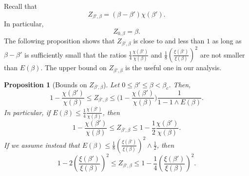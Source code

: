 \documentclass[11pt,a4paper]{article}
\numberwithin{equation}{section}
\theoremstyle{plain}
\newtheorem{Prop}[Thm]{Proposition}
\theoremstyle{definition}
\newcommand\1{\mathds{1}}
\begin{document}
Recall that
\begin{equation}
\label{eq:Zdef1}
Z_{\beta',\beta}=
(\beta-\beta')\chi(\beta').
\end{equation}
In particular,
\begin{equation}
\label{eq:Z0}
        Z_{0,\beta} = \beta .
\end{equation}
The following proposition shows that $Z_{\beta',\beta}$ is close to and less than $1$
as long as $\beta-\beta'$ is sufficiently small that the
ratios $\frac 14 \frac{\chi(\beta')}{\chi(\beta)}$ and
$\frac 18 (\frac{\xi(\beta')}{\xi(\beta)})^2$ are not smaller than $E(\beta)$. The upper bound on $Z_{\beta',\beta}$ is the useful one in our analysis.


\begin{Prop}[Bounds on $Z_{\beta',\beta}$]
\label{prop:Zbd}
Let $0\leq \beta'\leq \beta<\beta_c$. Then,
\begin{equation}
\label{eq: bounds on Z1}
	1-\frac{\chi(\beta')}{\chi(\beta)}\leq Z_{\beta',\beta}\leq \Big(1-\frac{\chi(\beta')}{\chi(\beta)}\Big)\frac{1}{1-1\wedge E(\beta)}.
\end{equation}
In particular, if $E(\beta)\leq \tfrac{1}{4}\tfrac{\chi(\beta')}{\chi(\beta)}$, then
\begin{equation}\label{eq: explicit bounds on Z1}
	1-\frac{\chi(\beta')}{\chi(\beta)}\leq Z_{\beta',\beta}\leq 1-\frac{1}{2}\frac{\chi(\beta')}{\chi(\beta)}.
\end{equation}
If we assume instead
that $E(\beta)\leq \tfrac{1}{8}(\tfrac{\xi(\beta')}{\xi(\beta)})^2 \wedge \tfrac{1}{2}$, then
\begin{equation}
\label{eq: bounds on Z in terms of n/N}
	1-2\left(\frac{\xi(\beta')}{\xi(\beta)}\right)^2\leq Z_{\beta',\beta}\leq 1-\frac{1}{4}\left(\frac{\xi(\beta')}{\xi(\beta)}\right)^2.
\end{equation}
\end{Prop}
\end{document}
